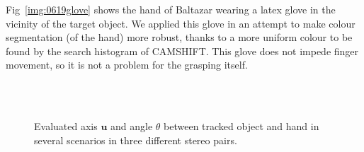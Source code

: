 Fig~\ref{img:0619glove} shows the hand of Baltazar wearing a latex glove in the vicinity of the target object. We applied this glove in an attempt to make colour segmentation (of the hand) more robust, thanks to a more uniform colour to be found by the search histogram of \ac{CAMSHIFT}. This glove does not impede finger movement, so it is not a problem for the grasping itself.


\begin{figure}
\centering
{} \\

 \\


\caption[Evaluation of target--hand axis and angle]{Evaluated axis $\mathbf{u}$ and angle $\theta$ between tracked object and hand in several scenarios in three different stereo pairs.} 
\label{img:angles}
\end{figure}

